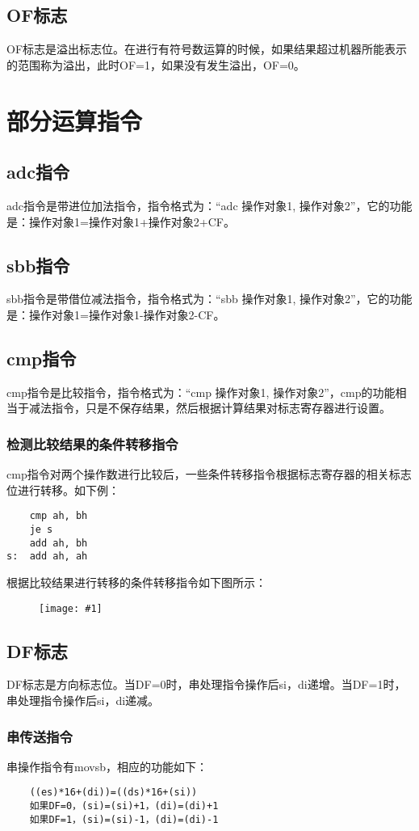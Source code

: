 \documentclass[a4paper,left=2.5cm,right=2.5cm,11pt]{article}
\newcommand{\fic}[1]{\begin{figure}[H]
		\center
		\texttt{[image: \#1]}
	\end{figure}}
\begin{document}
\subsection{OF标志}
	OF标志是溢出标志位。在进行有符号数运算的时候，如果结果超过机器所能表示的范围称为溢出，此时OF=1，如果没有发生溢出，OF=0。

\section{部分运算指令}
\subsection{adc指令}
	adc指令是带进位加法指令，指令格式为：“adc 操作对象1, 操作对象2”，它的功能是：操作对象1=操作对象1+操作对象2+CF。

\subsection{sbb指令}
	sbb指令是带借位减法指令，指令格式为：“sbb 操作对象1, 操作对象2”，它的功能是：操作对象1=操作对象1-操作对象2-CF。

\subsection{cmp指令}
	cmp指令是比较指令，指令格式为：“cmp 操作对象1, 操作对象2”，cmp的功能相当于减法指令，只是不保存结果，然后根据计算结果对标志寄存器进行设置。

\subsubsection{检测比较结果的条件转移指令}
	cmp指令对两个操作数进行比较后，一些条件转移指令根据标志寄存器的相关标志位进行转移。如下例：
	\begin{lstlisting}
	cmp ah, bh
	je s
	add ah, bh
s:	add ah, ah
	\end{lstlisting}

	根据比较结果进行转移的条件转移指令如下图所示：
	\fic{2.png}

\subsection{DF标志}
	DF标志是方向标志位。当DF=0时，串处理指令操作后si，di递增。当DF=1时，串处理指令操作后si，di递减。

\subsubsection{串传送指令}
	串操作指令有movsb，相应的功能如下：
	\begin{lstlisting}
	((es)*16+(di))=((ds)*16+(si))
	如果DF=0，(si)=(si)+1，(di)=(di)+1
	如果DF=1，(si)=(si)-1，(di)=(di)-1
	\end{lstlisting}
\end{document}
